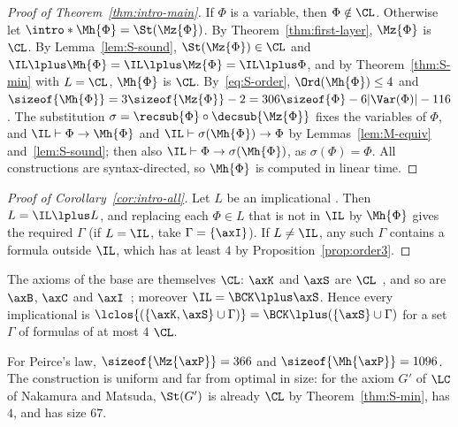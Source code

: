 \begin{proof}[Proof of Theorem~\ref{thm:intro-main}]
If $\Phi$ is a variable, then $\Phi\notin\CL$. Otherwise let
$\intro*\Mh{\Phi}=\St(\Mz{\Phi})$. By Theorem~\ref{thm:first-layer},
$\Mz{\Phi}$ is  $\CL$. By Lemma~\ref{lem:S-sound},
$\St(\Mz{\Phi})\in\CL$ and $\IL\lplus\Mh{\Phi}=\IL\lplus\Mz{\Phi}=\IL\lplus\Phi$,
and by Theorem~\ref{thm:S-min} with $L=\CL$, $\Mh{\Phi}$ is 
$\CL$. By~\eqref{eq:S-order}, $\Ord(\Mh{\Phi})\le4$ and
$\sizeof{\Mh{\Phi}}=3\sizeof{\Mz{\Phi}}-2=306\sizeof{\Phi}-6|\Var(\Phi)|-116$.
The substitution $\sigma=\recsub{\Phi}\circ\decsub{\Mz{\Phi}}$ fixes the
variables of $\Phi$, and $\IL\vdash\Phi\to\Mh{\Phi}$ and
$\IL\vdash\sigma(\Mh{\Phi})\to\Phi$ by Lemmas~\ref{lem:M-equiv}
and~\ref{lem:S-sound}; then also $\IL\vdash\Phi\to\sigma(\Mh{\Phi})$, as
$\sigma(\Phi)=\Phi$. All constructions are syntax-directed, so
$\Mh{\Phi}$ is computed in linear time.
\end{proof}

\begin{proof}[Proof of Corollary~\ref{cor:intro-all}]
Let $L$ be an implicational . Then $L=\IL\lplus L$,
and replacing each $\Phi\in L$ that is not in $\IL$ by $\Mh{\Phi}$ gives the
required $\Gamma$ (if $L=\IL$, take $\Gamma=\{\axI\}$). If $L\ne\IL$, any such
$\Gamma$ contains a formula outside $\IL$, which has  at least $4$
by Proposition~\ref{prop:order3}.
\end{proof}

\begin{remark}\label{rem:base}
The axioms of the base  are themselves  $\CL$:
$\axK$ and $\axS$ are  $\CL$~\cite[Example~2.3]{NM21}, and so
are $\axB$, $\axC$ and $\axI$~\cite[Sect.~5.3]{NM21}; moreover
$\IL=\BCK\lplus\axS$. Hence every implicational  is
$\lclos{(\{\axK,\axS\}\cup\Gamma)}=\BCK\lplus(\{\axS\}\cup\Gamma)$ for a set
$\Gamma$ of formulas of  at most $4$  $\CL$.
\end{remark}

\begin{example}\label{ex:peirce-size}
For Peirce's law, $\sizeof{\Mz{\axP}}=366$ and $\sizeof{\Mh{\axP}}=1096$.
The construction is uniform and far from optimal in size: for the axiom
$G'$ of $\LC$ of Nakamura and Matsuda, $\St(G')$ is already 
$\CL$ by Theorem~\ref{thm:S-min}, has  $4$, and has size $67$.
\end{example}
